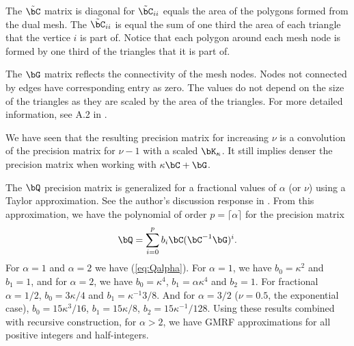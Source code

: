 The $\tilde{\bC}$ matrix is diagonal for $\tilde{\bC}_{ii}$ 
equals the area of the polygons formed from the dual mesh. 
The $\tilde{\bC}_{ii}$ is equal the sum of one third 
the area of each triangle that the vertice $i$ is part of. 
Notice that each polygon around each mesh node is formed 
by one third of the triangles that it is part of. 

The $\bG$ matrix reflects the connectivity of the mesh nodes. 
Nodes not connected by edges have corresponding entry as zero. 
The values do not depend on the size of the triangles as 
they are scaled by the area of the triangles. 
For more detailed information, 
see A.2 in \cite{lindgrenRL:2011}. 

We have seen that the resulting precision matrix for 
increasing $\nu$ is a convolution of the precision matrix 
for $\nu-1$ with a scaled $\bK_{\kappa}$. 
It still implies denser the precision matrix 
when working with $\kappa\bC + \bG$.



The $\bQ$ precision matrix is generalized for a fractional values 
of $\alpha$ (or $\nu$) using a Taylor approximation. 
See the author's discussion response in \cite{lindgrenRL:2011}. 
From this approximation, we have the polynomial of 
order $p=\lceil \alpha \rceil$ for the precision matrix 
\begin{equation}\label{eq:Qfrac}
\bQ = \sum_{i=0}^p b_i \bC(\bC^{-1}\bG)^i.
\end{equation}
For $\alpha=1$ and $\alpha=2$ we have (\ref{eq:Qalpha}). 
For $\alpha=1$, we have $b_0=\kappa^2$ and $b_1=1$, 
and for $\alpha=2$, we have $b_0=\kappa^4$, 
$b_1=\alpha\kappa^4$ and $b_2=1$. 
For fractional $\alpha=1/2$, 
$b_0=3\kappa/4$ and $b_1=\kappa^{-1}3/8$. 
And for $\alpha=3/2$ ($\nu=0.5$, the exponential case), 
$b_0=15\kappa^3/16$, $b_1=15\kappa/8$, 
$b_2=15\kappa^{-1}/128$. 
Using these results combined with recursive construction, 
for $\alpha>2$, we have GMRF approximations for all positive 
integers and half-integers. 

